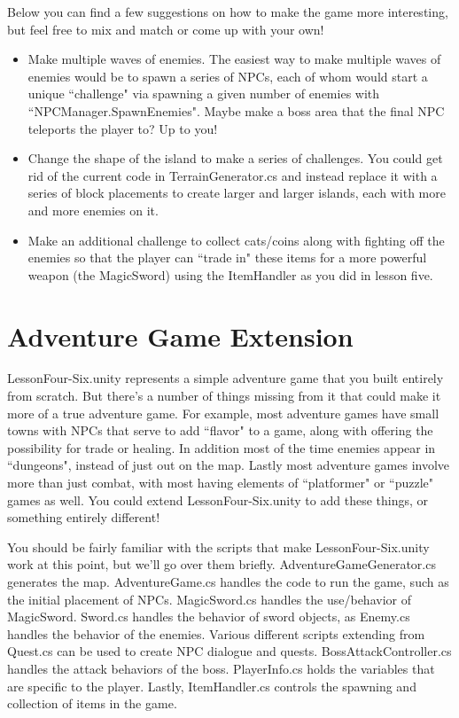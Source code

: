 \documentclass{article}
\begin{document}
Below you can find a few suggestions on how to make the game more interesting, but feel free to mix and match or come up with your own!

\begin{itemize}
  \item Make multiple waves of enemies. The easiest way to make multiple waves of enemies would be to spawn a series of NPCs, each of whom would start a unique ``challenge" via spawning a given number of enemies with ``NPCManager.SpawnEnemies". Maybe make a boss area that the final NPC teleports the player to? Up to you!
  \item Change the shape of the island to make a series of challenges. You could get rid of the current code in TerrainGenerator.cs and instead replace it with a series of block placements to create larger and larger islands, each with more and more enemies on it. 
  \item Make an additional challenge to collect cats/coins along with fighting off the enemies so that the player can ``trade in" these items for a more powerful weapon (the MagicSword) using the ItemHandler as you did in lesson five.
\end{itemize}

\section{Adventure Game Extension} 

LessonFour-Six.unity represents a simple adventure game that you built entirely from scratch. But there's a number of things missing from it that could make it more of a true adventure game. For example, most adventure games have small towns with NPCs that serve to add ``flavor" to a game, along with offering the possibility for trade or healing. In addition most of the time enemies appear in ``dungeons", instead of just out on the map. Lastly most adventure games involve more than just combat, with most having elements of ``platformer" or ``puzzle" games as well. You could extend LessonFour-Six.unity to add these things, or something entirely different! 

You should be fairly familiar with the scripts that make LessonFour-Six.unity work at this point, but we'll go over them briefly. AdventureGameGenerator.cs generates the map. AdventureGame.cs handles the code to run the game, such as the initial placement of NPCs. MagicSword.cs handles the use/behavior of MagicSword. Sword.cs handles the behavior of sword objects, as Enemy.cs handles the behavior of the enemies. Various different scripts extending from Quest.cs can be used to create NPC dialogue and quests. BossAttackController.cs handles the attack behaviors of the boss. PlayerInfo.cs holds the variables that are specific to the player. Lastly, ItemHandler.cs controls the spawning and collection of items in the game.
\end{document}
